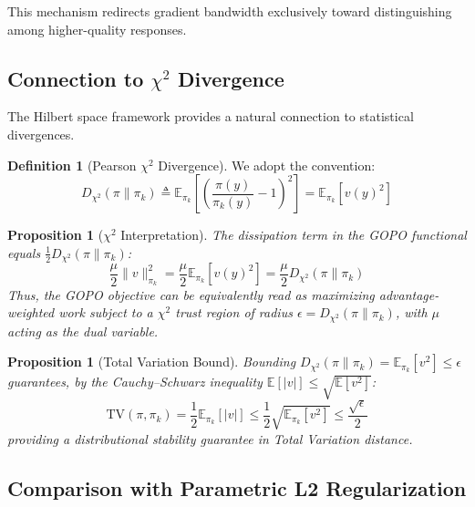 \documentclass[11pt]{article}
\newtheorem{proposition}[theorem]{Proposition}
\theoremstyle{definition}
\newtheorem{definition}[theorem]{Definition}
\theoremstyle{remark}
\newcommand{\E}{\mathbb{E}}
\newcommand{\pik}{\pi_k}
\begin{document}
This mechanism redirects gradient bandwidth exclusively toward distinguishing among higher-quality responses.

\subsection{Connection to $\chi^2$ Divergence}
\label{subsec:chi2}

The Hilbert space framework provides a natural connection to statistical divergences.

\begin{definition}[Pearson $\chi^2$ Divergence]
\label{def:chi2}
We adopt the convention:
\begin{equation}
    D_{\chi^2}(\pi \| \pik) \triangleq \E_{\pik}\!\left[\left(\frac{\pi(y)}{\pik(y)} - 1\right)^2\right] = \E_{\pik}\!\left[v(y)^2\right]
\end{equation}
\end{definition}

\begin{proposition}[$\chi^2$ Interpretation]
\label{prop:chi2}
The dissipation term in the GOPO functional equals $\frac{1}{2}D_{\chi^2}(\pi \| \pik)$:
\begin{equation}
    \frac{\mu}{2}\|v\|^2_{\pik} = \frac{\mu}{2}\E_{\pik}\!\left[v(y)^2\right] = \frac{\mu}{2}D_{\chi^2}(\pi \| \pik)
\end{equation}
Thus, the GOPO objective can be equivalently read as maximizing advantage-weighted work subject to a $\chi^2$ trust region of radius $\epsilon = D_{\chi^2}(\pi \| \pik)$, with $\mu$ acting as the dual variable.
\end{proposition}

\begin{proposition}[Total Variation Bound]
\label{prop:tv}
Bounding $D_{\chi^2}(\pi\|\pik) = \E_{\pik}[v^2] \leq \epsilon$ guarantees, by the Cauchy--Schwarz inequality $\E[|v|] \leq \sqrt{\E[v^2]}$:
\begin{equation}
    \mathrm{TV}(\pi, \pik) = \frac{1}{2}\E_{\pik}[|v|] \leq \frac{1}{2}\sqrt{\E_{\pik}[v^2]} \leq \frac{\sqrt{\epsilon}}{2}
\end{equation}
providing a distributional stability guarantee in Total Variation distance.
\end{proposition}

\subsection{Comparison with Parametric L2 Regularization}
\label{subsec:l2}
\end{document}
